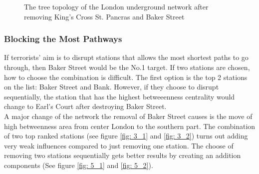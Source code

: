 \documentclass[a4paper,reqno,]{article}
\begin{document}
\begin{figure}[h]
\begin{minipage}[b]{0.5\textwidth}
    \caption{The tree topology of the London underground network after removing King's Cross St. Pancras and Baker Street}\label{fig: 2_2}
\end{minipage}
\end{figure}  

\subsubsection{Blocking the Most Pathways}
If terrorists' aim is to disrupt stations that allows the most shortest paths to go through, then Baker Street would be the No.1 target. If two stations are chosen, how to choose the combination is difficult. The first option is the top 2 stations on the list: Baker Street and Bank. However, if they choose to disrupt sequentially, the station that has the highest betweeenness centrality would change to Earl's Court after destroying Baker Street. 
\\A major change of the network the removal of Baker Street causes is the move of high betweenness area from center London to the southern part. The combination of two top ranked stations (see figure \ref{fig: 3_1} and \ref{fig: 3_2}) turns out adding very weak influences compared to just removing one station. The choose of removing two stations sequentially gets better results by creating an addition components (See figure \ref{fig: 5_1} and \ref{fig: 5_2}).
\end{document}

